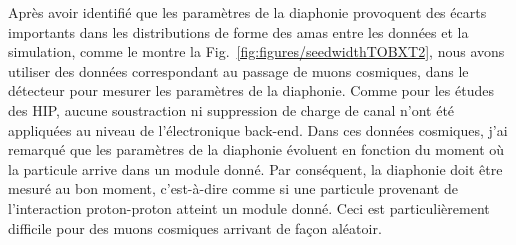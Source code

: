 
Après avoir identifié que les paramètres de la diaphonie provoquent des écarts importants dans les distributions de forme des amas entre les données et la simulation, comme le montre la Fig.~\ref{fig:figures/seedwidthTOBXT2}, nous avons utiliser des données correspondant au passage de muons cosmiques, dans le détecteur  pour mesurer les paramètres de la diaphonie. Comme pour les études des HIP, aucune soustraction ni suppression de charge de canal n’ont été appliquées au niveau de l’électronique back-end. Dans ces données cosmiques, j'ai remarqué que les paramètres de la diaphonie évoluent en fonction du moment où la particule arrive dans un module donné. Par conséquent, la diaphonie doit être mesuré au bon moment, c'est-à-dire comme si une particule provenant de l'interaction proton-proton atteint un module donné. Ceci est particulièrement difficile pour des muons cosmiques arrivant de façon aléatoir.

